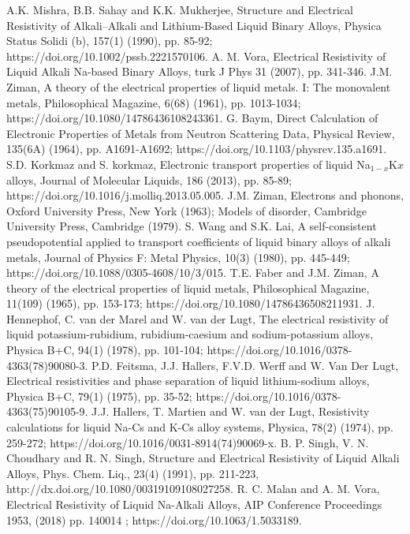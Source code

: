 \documentclass[final12pt]{elsarticle}
\begin{document}
\begin{thebibliography}{thesis}
A.K. Mishra, B.B. Sahay and K.K. Mukherjee, Structure and Electrical Resistivity of Alkali–Alkali and Lithium-Based Liquid Binary Alloys, Physica Status Solidi (b), 157(1) (1990), pp. 85-92; https://doi.org/10.1002/pssb.2221570106.
A. M. Vora, Electrical Resistivity of Liquid Alkali Na-based Binary
Alloys, turk J Phys 31 (2007), pp. 341-346.
J.M. Ziman, A theory of the electrical properties of liquid metals. I: The monovalent metals, Philosophical Magazine, 6(68) (1961), pp. 1013-1034; https://doi.org/10.1080/14786436108243361.
G. Baym, Direct Calculation of Electronic Properties of Metals from Neutron Scattering Data, Physical Review, 135(6A) (1964), pp. A1691-A1692; https://doi.org/10.1103/physrev.135.a1691.
S.D. Korkmaz and S. korkmaz, Electronic transport properties of liquid Na$_{1−x}$K$x$ alloys, Journal of Molecular Liquids, 186 (2013), pp. 85-89; https://doi.org/10.1016/j.molliq.2013.05.005.
 J.M. Ziman, Electrons and phonons, Oxford University Press, New York (1963); Models of disorder, Cambridge University Press, Cambridge (1979).
S. Wang and S.K. Lai, A self-consistent pseudopotential applied to transport coefficients of liquid binary alloys of alkali metals, Journal of Physics F: Metal Physics, 10(3) (1980), pp. 445-449; https://doi.org/10.1088/0305-4608/10/3/015.
T.E. Faber and J.M. Ziman, A theory of the electrical properties of liquid metals, Philosophical Magazine, 11(109) (1965), pp. 153-173; https://doi.org/10.1080/14786436508211931.
J. Hennephof, C. van der Marel and W. van der Lugt, The electrical resistivity of liquid potassium-rubidium, rubidium-caesium and sodium-potassium alloys, Physica B+C, 94(1) (1978), pp. 101-104; https://doi.org/10.1016/0378-4363(78)90080-3.
P.D. Feitsma, J.J. Hallers, F.V.D. Werff and W. Van Der Lugt, Electrical resistivities and phase separation of liquid lithium-sodium alloys, Physica B+C, 79(1) (1975), pp. 35-52; https://doi.org/10.1016/0378-4363(75)90105-9.
J.J. Hallers, T. Martien and W. van der Lugt, Resistivity calculations for liquid Na-Cs and K-Cs alloy systems, Physica, 78(2) (1974), pp. 259-272; https://doi.org/10.1016/0031-8914(74)90069-x.
B. P. Singh, V. N. Choudhary and R. N. Singh, Structure and Electrical Resistivity of Liquid Alkali Alloys, Phys. Chem. Liq., 23(4) (1991), pp. 211-223, http://dx.doi.org/10.1080/00319109108027258.
R. C. Malan and A. M. Vora, Electrical Resistivity of Liquid Na-Alkali Alloys, AIP Conference Proceedings 1953, (2018) pp. 140014 ; https://doi.org/10.1063/1.5033189.

\end{thebibliography}
\end{document}
